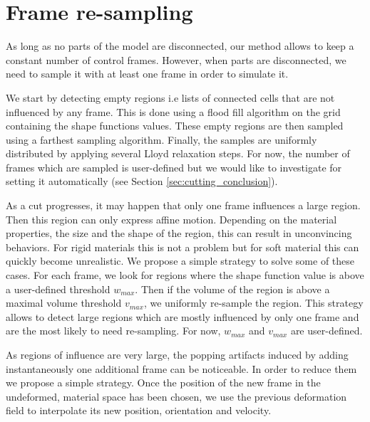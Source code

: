 
\section{Frame re-sampling} \label{sec:resampling}
As long as no parts of the model are disconnected, our method allows to keep a constant number of control frames. However, when parts are disconnected, we need to sample it with at least one frame in order to simulate it. 

We start by detecting empty regions i.e lists of connected cells that are not influenced by any frame. This is done using a flood fill algorithm on the grid containing the shape functions values. These empty regions are then sampled using a farthest sampling algorithm. Finally, the samples are uniformly distributed by applying several Lloyd relaxation steps. For now, the number of frames which are sampled is user-defined but we would like to investigate for setting it automatically (see Section \ref{sec:cutting_conclusion}). 

As a cut progresses, it may happen that only one frame influences a large region. Then this region can only express affine motion. Depending on the material properties, the size and the shape of the region, this can result in unconvincing behaviors. For rigid materials this is not a problem but for soft material this can quickly become unrealistic. We propose a simple strategy to solve some of these cases. For each frame, we look for regions where the shape function value is above a user-defined threshold $w_{max}$. Then if the volume of the region is above a maximal volume threshold $v_{max}$, we uniformly re-sample the region. This strategy allows to detect large regions which are mostly influenced by only one frame and are the most likely to need re-sampling. For now, $w_{max}$ and $v_{max}$ are user-defined.

As regions of influence are very large, the popping artifacts induced by adding instantaneously one additional frame can be noticeable. In order to reduce them we propose a simple strategy. Once the position of the new frame in the undeformed, material space has been chosen, we use the previous deformation field to interpolate its new position, orientation and velocity.

